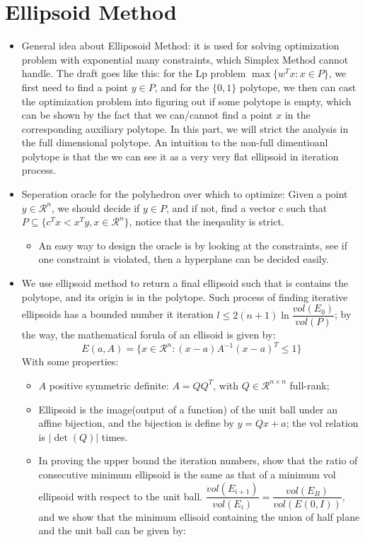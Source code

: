 \documentclass{article}
\begin{document}
\section{Ellipsoid Method}
\begin{itemize}
\item General idea about Elliposoid Method: it is used for solving optimization problem with exponential many constraints, which Simplex Method cannot handle. The draft goes like this: for the Lp problem $\max\{w^Tx:x\in P\}$, we first need to find a point $y\in P$, and for the $\{0,1\}$ polytope, we then can cast the optimization problem into figuring out if some polytope is empty, which can be shown by the fact that we can/cannot find a point $x$ in the corresponding auxiliary polytope. In this part, we will strict the analysis in the full dimensional polytope. An intuition to the non-full dimentioanl polytope is that the we can see it as a very very flat ellipsoid in iteration process.
\item Seperation oracle for the polyhedron over which to optimize: Given a point $y\in\mathcal{R}^n$, we should decide if $y\in P$, and if not, find a vector c such that $P\subseteq\{c^Tx<x^Ty, x\in\mathcal{R}^n\}$, notice that the ineqaulity is strict.
\begin{itemize}
\item An easy way to design the oracle is by looking at the constraints, see if one constraint is violated, then a hyperplane can be decided easily.
\end{itemize}
\item We use ellipsoid method to return a final ellipsoid such that is contains the polytope, and its origin is in the polytope. Such process of finding iterative ellipsoids has a bounded number it iteration $l\leq 2(n+1)\ln\dfrac{vol(E_0)}{vol(P)}$; by the way, the mathematical forula of an ellisoid is given by: 
\begin{equation*}
E(a,A)=\{x\in\mathcal{R}^n: (x-a)A^{-1}(x-a)^T\leq 1\}
\end{equation*}
With some properties:
\begin{itemize}
\item $A$ positive symmetric definite: $A=QQ^T$, with $Q\in\mathcal{R}^{n\times n}$ full-rank;
\item Ellipsoid is the image(output of a function) of the unit ball under an affine bijection, and the bijection is define by $y=Qx+a$; the vol relation is $|\det(Q)|$ times.
\item In proving the upper bound the iteration numbers, show that the ratio of consecutive minimum ellipsoid is the same as that of a minimum vol ellipsoid with respect to the unit ball. $\dfrac{vol(E_{i+1})}{vol(E_i)}=\dfrac{vol(E_B)}{vol(E(0,I))}$, and we show that the minimum ellisoid containing the union of half plane and the unit ball can be given by:

\end{itemize}
\end{itemize}
\end{document}
